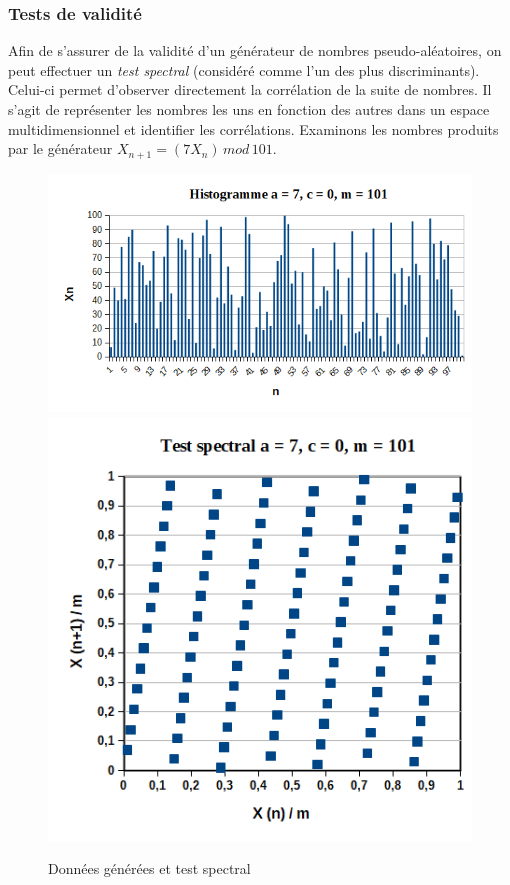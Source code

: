 \documentclass{scrartcl}
\begin{document}
\subsubsection{Tests de validité}\label{ss:spectral}
Afin de s'assurer de la validité d'un générateur de nombres pseudo-aléatoires,
on peut effectuer un \textit{ test spectral} (considéré comme l'un des plus
discriminants). Celui-ci permet d'observer directement la corrélation de la
suite de nombres.  Il s'agit de représenter les nombres les uns en fonction des
autres dans un espace multidimensionnel et identifier les corrélations.
Examinons les nombres produits par le générateur
$X_{n+1} =(7 X_{n})\, mod\, 101$.
\begin{figure}
    \begin{center}
    \includegraphics[scale=0.6]{img/histo7Xn[101].png}
    \hspace{0.1\textwidth}
    \includegraphics[scale=0.6]{img/a7m101.png}
    \end{center}
    \caption{Données générées et test spectral}
  \label{fig:DGTS}
  \end{figure}
\end{document}

